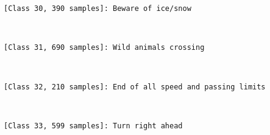 \documentclass[11pt]{article}
\begin{document}
    \begin{Verbatim}[commandchars=\\\{\}]
[Class 30, 390 samples]: Beware of ice/snow

    \end{Verbatim}

    \begin{center}
    \end{center}
    { \hspace*{\fill} \\}
    
    \begin{Verbatim}[commandchars=\\\{\}]
[Class 31, 690 samples]: Wild animals crossing

    \end{Verbatim}

    \begin{center}
    \end{center}
    { \hspace*{\fill} \\}
    
    \begin{Verbatim}[commandchars=\\\{\}]
[Class 32, 210 samples]: End of all speed and passing limits

    \end{Verbatim}

    \begin{center}
    \end{center}
    { \hspace*{\fill} \\}
    
    \begin{Verbatim}[commandchars=\\\{\}]
[Class 33, 599 samples]: Turn right ahead

    \end{Verbatim}

    \begin{center}
    \end{center}
    { \hspace*{\fill} \\}
    
\end{document}
